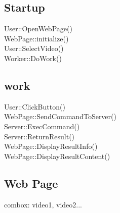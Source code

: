 \documentclass{article}
\begin{document}
\subsection{Startup}

User::OpenWebPage()\\
\indent WebPage::initialize()\\
\indent User::SelectVideo()\\
\indent Worker::DoWork()

\subsection{work}
User::ClickButton()\\
\indent WebPage::SendCommandToServer()\\
\indent Server::ExecCommand()\\
\indent Server::ReturnResult()\\
\indent \indent WebPage::DisplayResultInfo()\\
\indent \indent WebPage::DisplayResultContent()

\subsection{Web Page}

combox: video1, video2...
\end{document}
